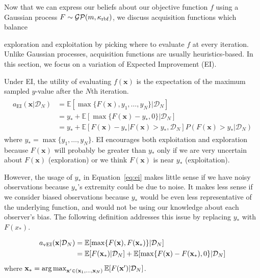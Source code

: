 Now that we can express our beliefs about our objective function $f$
using a Gaussian process $F \sim \mathcal{GP}(m, \kappa_{\mathrm{rbf}})$,
we discuss acquisition functions which balance

exploration and exploitation by picking where to evaluate $f$ at every iteration.
Unlike Gaussian processes, acquisition functions are usually heuristics-based.
In this section, we focus on a variation of Expected Improvement (EI).

Under EI, the utility of evaluating $f(\mathbf{x})$ is the expectation of the maximum sampled $y$-value after the $N$th iteration.
\begin{align}
    \label{eq:ei}
    \begin{split}
        a_{\mathrm{EI}}(\mathbf{x} | \mathcal{D}_N) & = \mathbb{E}[\max\{F(\mathbf{x}), y_1, \dots, y_N\} | \mathcal{D}_N] \\
        & = y_* + \mathbb{E}[\max\{F(\mathbf{x}) - y_*, 0\} |\mathcal{D}_N] \\
        & = y_* + \mathbb{E}[F(\mathbf{x}) - y_* | F(\mathbf{x}) > y_*, \mathcal{D}_N]P(F(\mathbf{x}) > y_* | \mathcal{D}_N)
    \end{split}
\end{align}
where $y_* = \max\{y_1, \dots, y_N\}$.
EI encourages both exploitation and exploration because $F(\mathbf{x})$ will probably be greater than $y_*$ only if we are very uncertain about $F(\mathbf{x})$ (exploration) or we think $F(\mathbf{x})$ is near $y_*$ (exploitation).

However, the usage of $y_*$ in Equation~\ref{eq:ei} makes little sense if we have noisy observations because $y_*$'s extremity could be due to noise.
It makes less sense if we consider biased observations because $y_*$ would be even less representative of the underlying function, and would not be using our knowledge about each observer's bias.
The following definition addresses this issue by replacing $y_*$ with $F(x_*)$.

\begin{definition}[vEI]
    \begin{equation}
        \begin{split}
            a_{\mathrm{vEI}}(\mathbf{x} | \mathcal{D}_N) & = \mathbb{E}[\max \{ F(\mathbf{x}), F(\mathbf{x}_*) \} | \mathcal{D}_N] \\
            & = \mathbb{E}[F(\mathbf{x}_*) | \mathcal{D}_N] + \mathbb{E}[\max \{ F(\mathbf{x}) - F(\mathbf{x}_*), 0 \} | \mathcal{D}_N]
        \end{split}
        \label{eq:vei}
    \end{equation}
    where $\mathbf{x}_* = \operatorname*{arg\,max}_{\mathbf{x'} \in (\mathbf{x}_1, \dots, \mathbf{x}_N)} \mathbb{E}[F(\mathbf{x'}) | \mathcal{D}_N]$.
\end{definition}

